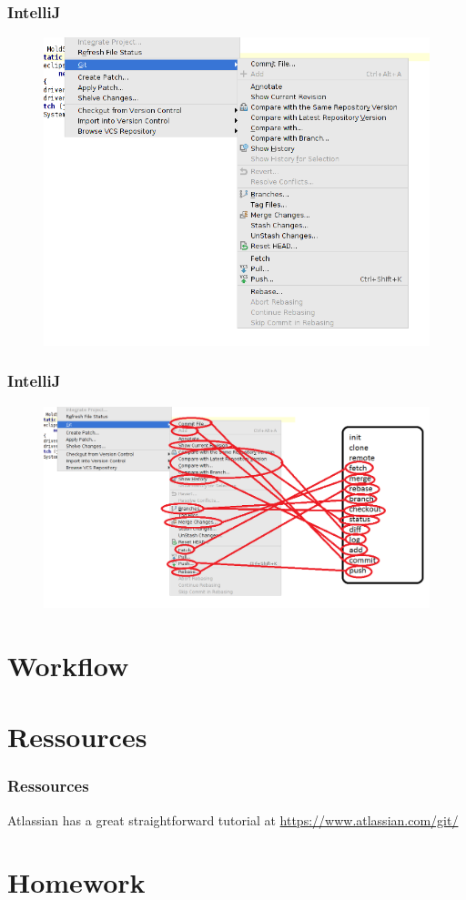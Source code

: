\documentclass{beamer}
\begin{document}
\begin{frame}
    \frametitle{IntelliJ}
    \begin{figure}[h!]
        \begin{center}
            \includegraphics[scale=0.55]{intellij1.png}
        \end{center}
    \end{figure}
\end{frame}

\begin{frame}
    \frametitle{IntelliJ}
    \begin{figure}[h!]
        \begin{center}
            \includegraphics[scale=0.4]{intellij2.png}
        \end{center}
    \end{figure}
\end{frame}

\section{Workflow}

\section{Ressources}

\begin{frame}
    \frametitle{Ressources}
    \begin{center}
        Atlassian has a great straightforward tutorial at
        \url{https://www.atlassian.com/git/}
    \end{center}
\end{frame}

\section{Homework}
\end{document}
